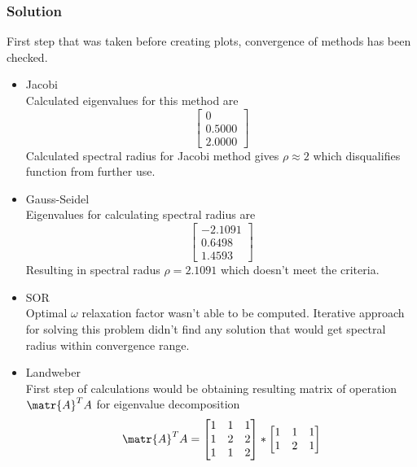 \subsubsection*{Solution}
First step that was taken before creating plots, convergence of methods has been checked.
\begin{itemize}
  \item Jacobi \\
  Calculated eigenvalues for this method are 
  \begin{equation*}
    \begin{bmatrix}
      0 \\
      0.5000 \\
      2.0000
    \end{bmatrix}
  \end{equation*}
  Calculated spectral radius for Jacobi method gives $\rho \approx 2$ which disqualifies function from further use.
  \item Gauss-Seidel \\ 
  Eigenvalues for calculating spectral radius are 
  \begin{equation*}
    \begin{bmatrix}
      -2.1091 \\
      0.6498 \\
      1.4593
    \end{bmatrix}
  \end{equation*}
  Resulting in spectral radus $ \rho = 2.1091 $ which doesn't meet the criteria. 
  \item SOR \\
  Optimal $\omega$ relaxation factor wasn't able to be computed.
  Iterative approach for solving this problem didn't find any solution that would get spectral radius within convergence range.
  \item Landweber \\
  First step of calculations would be obtaining resulting matrix of operation $\matr{A}^TA$ for eigenvalue decomposition
  \begin{equation*}
    \matr{A}^TA = 
    \begin{bmatrix}
      1 & 1 & 1 \\
      1 & 2 & 2 \\
      1 & 1 & 2
      \end{bmatrix} * 
      \begin{bmatrix}
        1 & 1 & 1 \\
        1 & 2 & 1 \\

\end{bmatrix}
\end{equation*}
\end{itemize}
